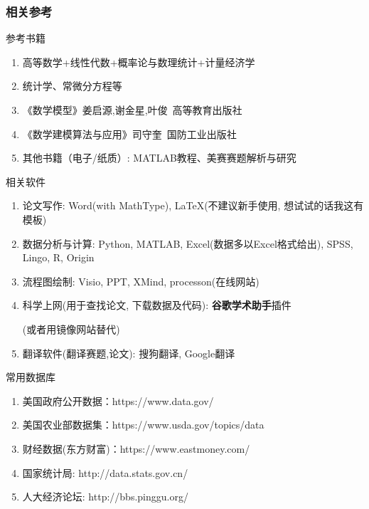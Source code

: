 \documentclass{ctexbeamer}
\begin{document}
\subsubsection{相关参考} %
\label{ssub:相关参考}

\begin{frame}{参考书籍}
	\begin{enumerate}
		\item  高等数学+线性代数+概率论与数理统计+计量经济学

		\item  统计学、常微分方程等

		\item 《数学模型》姜启源,谢金星,叶俊~高等教育出版社

		\item 《数学建模算法与应用》司守奎~国防工业出版社

		\item 其他书籍（电子/纸质）: MATLAB教程、美赛赛题解析与研究

	\end{enumerate}
\end{frame}

\begin{frame}{相关软件}
	\begin{enumerate}
		\item 论文写作: Word(with MathType), \LaTeX(不建议新手使用, 想试试的话我这有模板)

		\item 数据分析与计算: Python, MATLAB, Excel(数据多以Excel格式给出),
		      SPSS, Lingo, R, Origin

		\item 流程图绘制: Visio, PPT, XMind, processon(在线网站)

		\item 科学上网(用于查找论文, 下载数据及代码): \textbf{谷歌学术助手}插件

		      (或者用镜像网站替代)

		\item 翻译软件(翻译赛题,论文): 搜狗翻译, Google翻译
	\end{enumerate}
\end{frame}

\begin{frame}{常用数据库}
	\begin{enumerate}
		\item 美国政府公开数据：https://www.data.gov/
		\item 美国农业部数据集：https://www.usda.gov/topics/data
		\item 财经数据(东方财富)：https://www.eastmoney.com/
		\item 国家统计局:  http://data.stats.gov.cn/
		\item 人大经济论坛: http://bbs.pinggu.org/
	\end{enumerate}
\end{frame}
\end{document}
